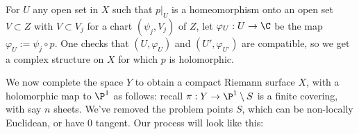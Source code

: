 \documentclass[11pt]{report}
\begin{document}
For $U$ any open set in $X$ such that $p|_U$ is a homeomorphism onto an open set $V \subset Z$ with $V \subset V_j$ for a chart $(\psi_j,V_j)$ of $Z$, let $\varphi_U:U \to \C$ be the map $\varphi_U:=\psi_j \circ p$. One checks that $(U,\varphi_U)$ and $(U',\varphi_{U'})$ are compatible, so we get a complex structure on $X$ for which $p$ is holomorphic.

We now complete the space $Y$ to obtain a compact Riemann surface $X$, with a holomorphic map to $\P^1$ as follows: recall $\pi:Y \to \P^1 \setminus S$ is a finite covering, with say $n$ sheets. We've removed the problem points $S$, which can be non-locally Euclidean, or have 0 tangent. Our process will look like this:

\begin{center}

\begin{tikzpicture}[x=0.75pt,y=0.75pt,yscale=-1,xscale=1]


\end{tikzpicture}
\end{center}
\end{document}
